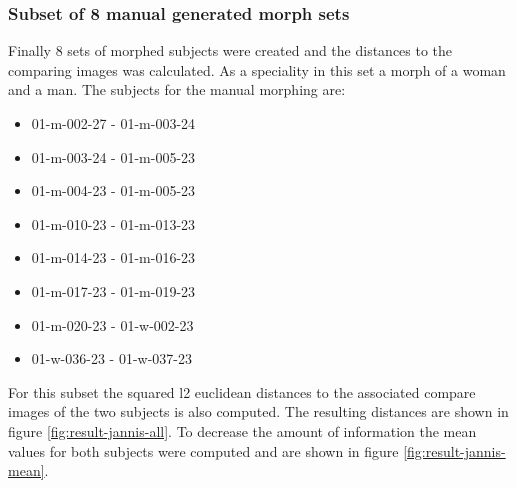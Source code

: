 \subsubsection{Subset of 8 manual generated morph sets}
\label{sec:subsetman}
Finally 8 sets of morphed subjects were created and the distances to the comparing images was calculated. As a speciality in this set a morph of a woman and a man.
The subjects for the manual morphing are:
\begin{multicols}{2}
\begin{itemize}
\item 01-m-002-27 - 01-m-003-24
\item 01-m-003-24 - 01-m-005-23
\item 01-m-004-23 - 01-m-005-23
\item 01-m-010-23 - 01-m-013-23
\item 01-m-014-23 - 01-m-016-23
\item 01-m-017-23 - 01-m-019-23
\item 01-m-020-23 - 01-w-002-23
\item 01-w-036-23 - 01-w-037-23
\end{itemize}
\end{multicols}
For this subset the squared l2 euclidean distances to the associated compare images of the two subjects is also computed. The resulting distances are shown in figure \ref{fig:result-jannis-all}. To decrease the amount of information the mean values for both subjects were computed and are shown in figure \ref{fig:result-jannis-mean}.

